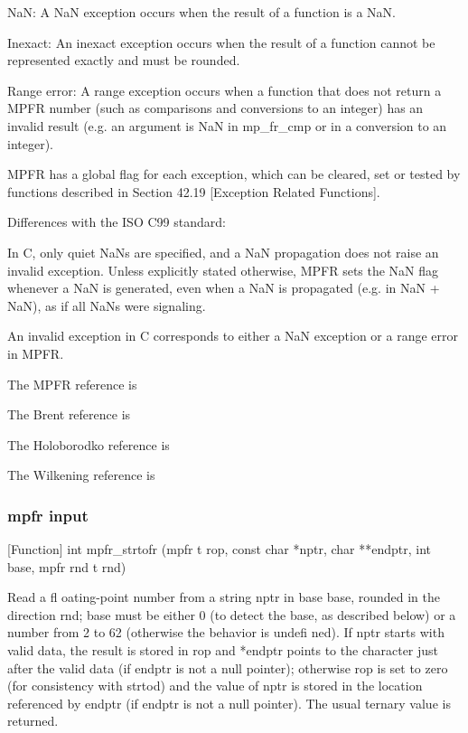 \vspace{0.3cm}
NaN: A NaN exception occurs when the result of a function is a NaN. 

\vspace{0.3cm}
Inexact: An inexact exception occurs when the result of a function cannot be represented exactly and must be rounded. 

\vspace{0.3cm}
Range error: A range exception occurs when a function that does not return a MPFR number (such as comparisons and conversions to an integer) has an invalid result (e.g. an argument is NaN in mp\_fr\_cmp or in a conversion to an integer). 

\vspace{0.3cm}
MPFR has a global flag for each exception, which can be cleared, set or tested by functions described in Section 42.19 [Exception Related Functions].

\vspace{0.3cm}
Differences with the ISO C99 standard: 

In C, only quiet NaNs are specified, and a NaN propagation does not raise an invalid exception. Unless explicitly stated otherwise, MPFR sets the NaN flag whenever a NaN is generated, even when a NaN is propagated (e.g. in NaN + NaN), as if all NaNs were signaling. 

An invalid exception in C corresponds to either a NaN exception or a range error in MPFR. 





The MPFR reference is \cite{MPFR_2007}

The Brent reference is \cite{Brent2010}

The Holoborodko reference is \cite{Holoborodko2012}

The Wilkening reference is \cite{Wilkening2008}

\lipsum[1]


\subsubsection{mpfr input}

[Function] int mpfr\_strtofr (mpfr t rop, const char *nptr, char **endptr, int base,
mpfr rnd t rnd)

Read a fl oating-point number from a string nptr in base base, rounded in the direction rnd;
base must be either 0 (to detect the base, as described below) or a number from 2 to 62
(otherwise the behavior is undefi ned). If nptr starts with valid data, the result is stored in
rop and *endptr points to the character just after the valid data (if endptr is not a null
pointer); otherwise rop is set to zero (for consistency with strtod) and the value of nptr
is stored in the location referenced by endptr (if endptr is not a null pointer). The usual
ternary value is returned.

